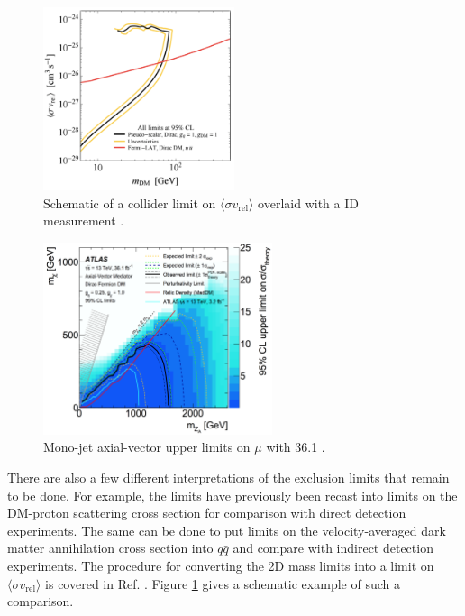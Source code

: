 \begin{figure}[!htb]
\centering
\includegraphics[width=0.5\textwidth]{Figures/id.png}
\caption{Schematic of a collider limit on $\langle \sigma v_\text{rel} \rangle$ overlaid with a ID measurement \cite{Boveia:2016mrp}.}
\label{fig:id}
\end{figure}

\begin{figure}[!htb]
\centering
\includegraphics[width=0.6\textwidth]{Figures/limits_dmA_sigma.png}
\caption{Mono-jet axial-vector upper limits on $\mu$ with 36.1 \ifb \cite{Collaboration:2268179}.}
\label{fig:limits_dmA_sigma_monojet}
\end{figure}

There are also a few different interpretations of the \monoZ exclusion limits that remain to be done. For example, the limits have previously been recast into limits on the DM-proton scattering cross section for comparison with direct detection experiments. The same can be done to put limits on the velocity-averaged dark matter annihilation cross section into $q\bar{q}$ and compare with indirect detection experiments. The procedure for converting the 2D mass limits into a limit on $\langle \sigma v_\text{rel} \rangle$ is covered in Ref. \cite{Boveia:2016mrp}. Figure \ref{fig:id} gives a schematic example of such a comparison.

